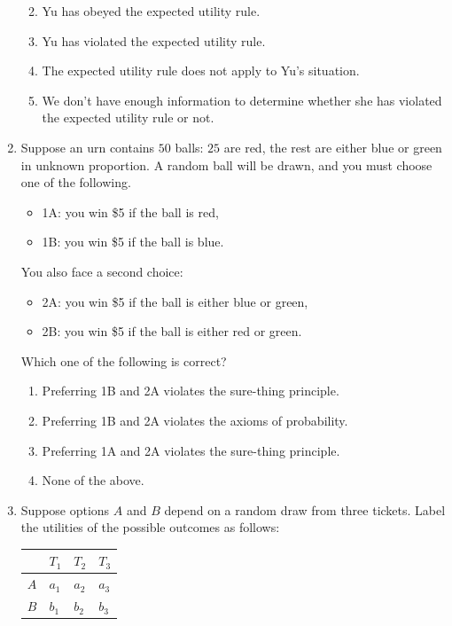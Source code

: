 \documentclass[justified]{tufte-book}
\providecommand{\tightlist}{%
  \setlength{\itemsep}{0pt}\setlength{\parskip}{0pt}}
\theoremstyle{definition}
\theoremstyle{definition}
\theoremstyle{definition}
\theoremstyle{definition}
\theoremstyle{remark}
\begin{document}
\begin{enumerate}
  \begin{enumerate}
  \def\labelenumii{\alph{enumii}.}
  \tightlist
  \item
    Yu has obeyed the expected utility rule.
  \item
    Yu has violated the expected utility rule.
  \item
    The expected utility rule does not apply to Yu's situation.
  \item
    We don't have enough information to determine whether she has violated the expected utility rule or not.
  \end{enumerate}
\item
  Suppose an urn contains \(50\) balls: \(25\) are red, the rest are either blue or green in unknown proportion. A random ball will be drawn, and you must choose one of the following.

  \begin{itemize}
  \tightlist
  \item
    1A: you win \$5 if the ball is red,
  \item
    1B: you win \$5 if the ball is blue.
  \end{itemize}

  You also face a second choice:

  \begin{itemize}
  \tightlist
  \item
    2A: you win \$5 if the ball is either blue or green,
  \item
    2B: you win \$5 if the ball is either red or green.
  \end{itemize}

  Which one of the following is correct?

  \begin{enumerate}
  \def\labelenumii{\alph{enumii}.}
  \tightlist
  \item
    Preferring 1B and 2A violates the sure-thing principle.
  \item
    Preferring 1B and 2A violates the axioms of probability.
  \item
    Preferring 1A and 2A violates the sure-thing principle.
  \item
    None of the above.
  \end{enumerate}
\item
  Suppose options \(A\) and \(B\) depend on a random draw from three tickets. Label the utilities of the possible outcomes as follows:

  \begin{longtable}[]{@{}llll@{}}
  \toprule
  & \(T_1\) & \(T_2\) & \(T_3\) \\
  \midrule
  \endhead
  \(A\) & \(a_1\) & \(a_2\) & \(a_3\) \\
  \(B\) & \(b_1\) & \(b_2\) & \(b_3\) \\
  \bottomrule
  \end{longtable}


\end{enumerate}
\end{document}
